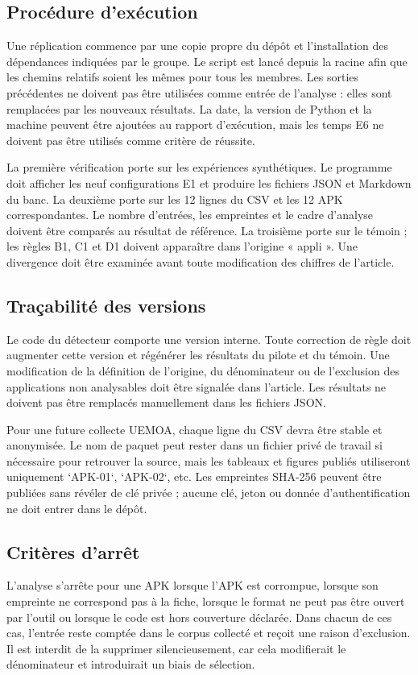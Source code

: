 \documentclass[conference,a4paper]{IEEEtran}
\begin{document}
\subsection{Procédure d'exécution}
Une réplication commence par une copie propre du dépôt et l'installation des dépendances indiquées par le groupe. Le script est lancé depuis la racine afin que les chemins relatifs soient les mêmes pour tous les membres. Les sorties précédentes ne doivent pas être utilisées comme entrée de l'analyse : elles sont remplacées par les nouveaux résultats. La date, la version de Python et la machine peuvent être ajoutées au rapport d'exécution, mais les temps E6 ne doivent pas être utilisés comme critère de réussite.

La première vérification porte sur les expériences synthétiques. Le programme doit afficher les neuf configurations E1 et produire les fichiers JSON et Markdown du banc. La deuxième porte sur les 12 lignes du CSV et les 12 APK correspondantes. Le nombre d'entrées, les empreintes et le cadre d'analyse doivent être comparés au résultat de référence. La troisième porte sur le témoin ; les règles B1, C1 et D1 doivent apparaître dans l'origine « appli ». Une divergence doit être examinée avant toute modification des chiffres de l'article.

\subsection{Traçabilité des versions}
Le code du détecteur comporte une version interne. Toute correction de règle doit augmenter cette version et régénérer les résultats du pilote et du témoin. Une modification de la définition de l'origine, du dénominateur ou de l'exclusion des applications non analysables doit être signalée dans l'article. Les résultats ne doivent pas être remplacés manuellement dans les fichiers JSON.

Pour une future collecte UEMOA, chaque ligne du CSV devra être stable et anonymisée. Le nom de paquet peut rester dans un fichier privé de travail si nécessaire pour retrouver la source, mais les tableaux et figures publiés utiliseront uniquement `APK-01`, `APK-02`, etc. Les empreintes SHA-256 peuvent être publiées sans révéler de clé privée ; aucune clé, jeton ou donnée d'authentification ne doit entrer dans le dépôt.

\subsection{Critères d'arrêt}
L'analyse s'arrête pour une APK lorsque l'APK est corrompue, lorsque son empreinte ne correspond pas à la fiche, lorsque le format ne peut pas être ouvert par l'outil ou lorsque le code est hors couverture déclarée. Dans chacun de ces cas, l'entrée reste comptée dans le corpus collecté et reçoit une raison d'exclusion. Il est interdit de la supprimer silencieusement, car cela modifierait le dénominateur et introduirait un biais de sélection.
\end{document}
